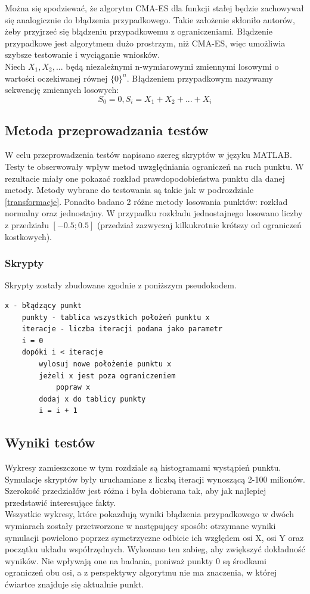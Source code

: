 \documentclass{mini}
\begin{document}
Można się spodziewać, że algorytm CMA-ES dla funkcji stałej będzie zachowywał się analogicznie do błądzenia przypadkowego. Takie założenie skłoniło autorów, żeby przyjrzeć się błądzeniu przypadkowemu z ograniczeniami. Błądzenie przypadkowe jest algorytmem dużo prostrzym, niż CMA-ES, więc umożliwia szybsze testowanie i wyciąganie wniosków.\\
Niech $ X_1, X_2, ... $ będą niezależnymi n-wymiarowymi zmiennymi losowymi o wartości oczekiwanej równej $ \{0\}^n $. Błądzeniem przypadkowym nazywamy sekwencję zmiennych losowych:
\begin{equation}
S_0 = 0, S_i=X_1+X_2+...+X_i
\end{equation}

\subsection{Metoda przeprowadzania testów}
W celu przeprowadzenia testów napisano szereg skryptów w języku MATLAB. Testy te obserwowały wpływ metod uwzględniania ograniczeń na ruch punktu. W rezultacie miały one pokazać rozkład prawdopodobieństwa punktu dla danej metody. Metody wybrane do testowania są takie jak w podrozdziale \ref{transformacje}.
Ponadto badano 2 różne metody losowania punktów: rozkład normalny oraz jednostajny. W przypadku rozkładu jednostajnego losowano liczby z przedziału $[-0.5; 0.5]$ (przedział zazwyczaj kilkukrotnie krótszy od ograniczeń kostkowych).


\subsubsection*{Skrypty}
Skrypty zostały zbudowane zgodnie z poniższym pseudokodem.
\begin{Verbatim}[baselinestretch=1.1]
	x - błądzący punkt
	punkty - tablica wszystkich położeń punktu x
	iteracje - liczba iteracji podana jako parametr
	i = 0
	dopóki i < iteracje
		wylosuj nowe położenie punktu x
		jeżeli x jest poza ograniczeniem
			popraw x
		dodaj x do tablicy punkty
		i = i + 1
\end{Verbatim}

\subsection{Wyniki testów}
Wykresy zamieszczone w tym rozdziale są histogramami wystąpień punktu. Symulacje skryptów były uruchamiane z liczbą iteracji wynoszącą 2-100 milionów. Szerokość przedziałów jest różna i była dobierana tak, aby jak najlepiej przedstawić interesujące fakty.\\
Wszystkie wykresy, które pokazdują wyniki błądzenia przypadkowego w dwóch wymiarach zostały przetworzone w następujący sposób: otrzymane wyniki symulacji powielono poprzez symetrzyczne odbicie ich względem osi X, osi Y oraz początku układu współrzędnych. Wykonano ten zabieg, aby zwiększyć dokładność wyników. Nie wpływają one na badania, poniważ punkty 0 są środkami ograniczeń obu osi, a z perspektywy algorytmu nie ma znaczenia, w której ćwiartce znajduje się aktualnie punkt.
\end{document}

